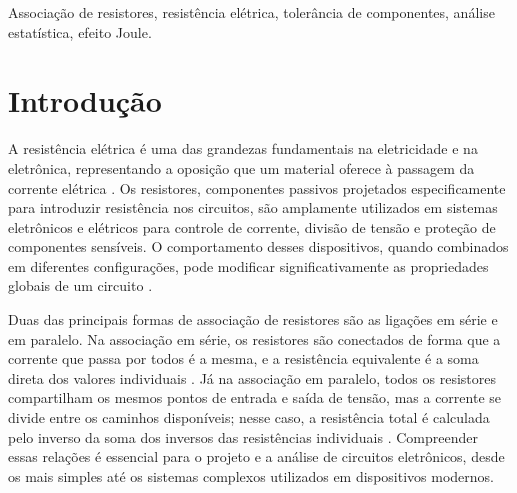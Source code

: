 \documentclass[conference]{IEEEtran}
\begin{document}
\begin{IEEEkeywords}
    Associação de resistores, resistência elétrica, tolerância de componentes, análise estatística, efeito Joule.
\end{IEEEkeywords}


\section{Introdução}



A resistência elétrica é uma das grandezas fundamentais na eletricidade e na eletrônica, representando a oposição que um material oferece à passagem da corrente elétrica \cite{hayt2019analise}. Os resistores, componentes passivos projetados especificamente para introduzir resistência nos circuitos, são amplamente utilizados em sistemas eletrônicos e elétricos para controle de corrente, divisão de tensão e proteção de componentes sensíveis. O comportamento desses dispositivos, quando combinados em diferentes configurações, pode modificar significativamente as propriedades globais de um circuito \cite{boylestad2014dispositivos}.

Duas das principais formas de associação de resistores são as ligações em série e em paralelo. Na associação em série, os resistores são conectados de forma que a corrente que passa por todos é a mesma, e a resistência equivalente é a soma direta dos valores individuais \cite{hayt2019analise}. Já na associação em paralelo, todos os resistores compartilham os mesmos pontos de entrada e saída de tensão, mas a corrente se divide entre os caminhos disponíveis; nesse caso, a resistência total é calculada pelo inverso da soma dos inversos das resistências individuais \cite{hayt2019analise}. Compreender essas relações é essencial para o projeto e a análise de circuitos eletrônicos, desde os mais simples até os sistemas complexos utilizados em dispositivos modernos.
\end{document}
